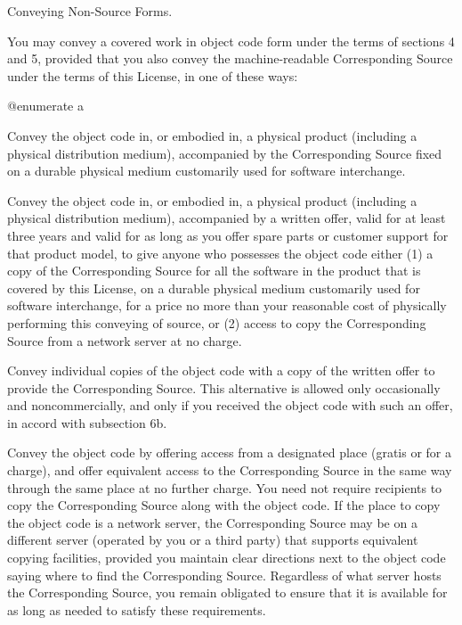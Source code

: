\item Conveying Non-Source Forms.

You may convey a covered work in object code form under the terms of
sections 4 and 5, provided that you also convey the machine-readable
Corresponding Source under the terms of this License, in one of these
ways:

@enumerate a
\item
Convey the object code in, or embodied in, a physical product
(including a physical distribution medium), accompanied by the
Corresponding Source fixed on a durable physical medium customarily
used for software interchange.

\item
Convey the object code in, or embodied in, a physical product
(including a physical distribution medium), accompanied by a written
offer, valid for at least three years and valid for as long as you
offer spare parts or customer support for that product model, to give
anyone who possesses the object code either (1) a copy of the
Corresponding Source for all the software in the product that is
covered by this License, on a durable physical medium customarily used
for software interchange, for a price no more than your reasonable
cost of physically performing this conveying of source, or (2) access
to copy the Corresponding Source from a network server at no charge.

\item
Convey individual copies of the object code with a copy of the written
offer to provide the Corresponding Source.  This alternative is
allowed only occasionally and noncommercially, and only if you
received the object code with such an offer, in accord with subsection
6b.

\item
Convey the object code by offering access from a designated place
(gratis or for a charge), and offer equivalent access to the
Corresponding Source in the same way through the same place at no
further charge.  You need not require recipients to copy the
Corresponding Source along with the object code.  If the place to copy
the object code is a network server, the Corresponding Source may be
on a different server (operated by you or a third party) that supports
equivalent copying facilities, provided you maintain clear directions
next to the object code saying where to find the Corresponding Source.
Regardless of what server hosts the Corresponding Source, you remain
obligated to ensure that it is available for as long as needed to
satisfy these requirements.

